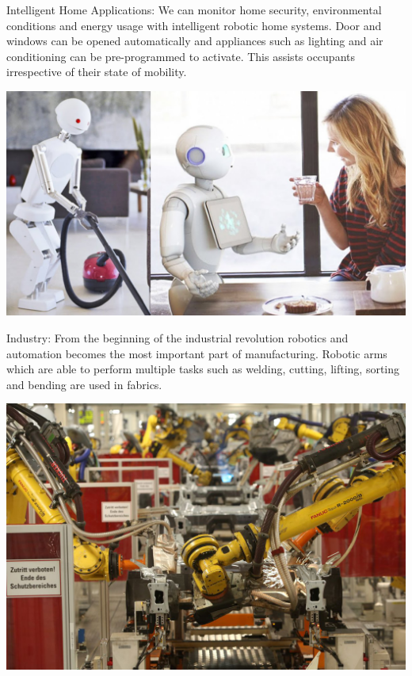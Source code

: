 \documentclass{fisatproject}
\begin{document}
Intelligent Home Applications: We can monitor home security, environmental conditions and energy usage with intelligent robotic home systems. Door and windows can be opened automatically and appliances such as lighting and air conditioning can be pre-programmed to activate. This assists occupants irrespective of their state of mobility.

\begin{center}
\includegraphics[scale=.3]{home.png}
\end{center}

Industry: From the beginning of the industrial revolution robotics and automation becomes the most important part of manufacturing. Robotic arms which are able to perform multiple tasks such as welding, cutting, lifting, sorting and bending are used in fabrics. 
\newpage
\begin{center}
\includegraphics[scale=.3]{ind.png}
\end{center}
\end{document}
